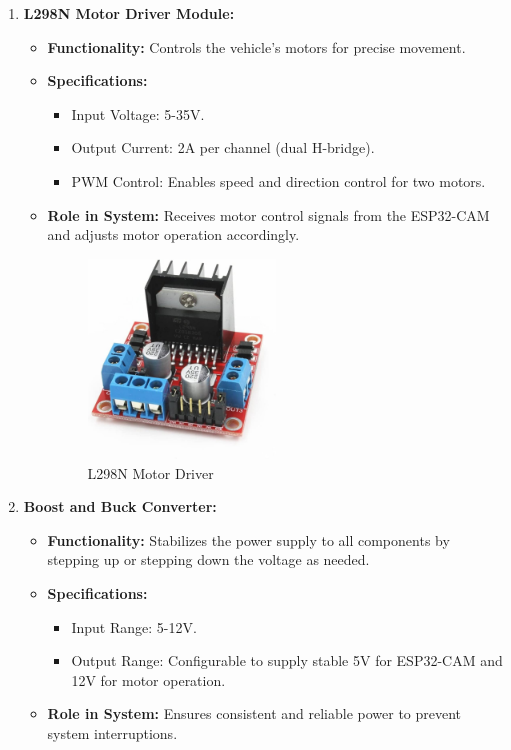 \documentclass[12pt,a4paper]{report}
\begin{document}
\begin{enumerate}
\begin{itemize}
    \end{itemize}



    \item \textbf{L298N Motor Driver Module:}

    \begin{itemize}
        \item \textbf{Functionality:} Controls the vehicle's motors for precise movement.
        \item \textbf{Specifications:}
        \begin{itemize}
            \item Input Voltage: 5-35V.
            \item Output Current: 2A per channel (dual H-bridge).
            \item PWM Control: Enables speed and direction control for two motors.
        \end{itemize}
        \item \textbf{Role in System:} Receives motor control signals from the ESP32-CAM and adjusts motor operation accordingly.\\


\begin{figure}[H]
    \centering
    \includegraphics[width=0.5\textwidth]{l298n}
    \caption{L298N Motor Driver}
    \label{fig:l298n}
\end{figure}

    
    \end{itemize}

    \item \textbf{Boost and Buck Converter:}
    \begin{itemize}
        \item \textbf{Functionality:} Stabilizes the power supply to all components by stepping up or stepping down the voltage as needed.
        \item \textbf{Specifications:}
        \begin{itemize}
            \item Input Range: 5-12V.
            \item Output Range: Configurable to supply stable 5V for ESP32-CAM and 12V for motor operation.
        \end{itemize}
        \item \textbf{Role in System:} Ensures consistent and reliable power to prevent system interruptions.
        

\end{itemize}
\end{enumerate}
\end{document}
